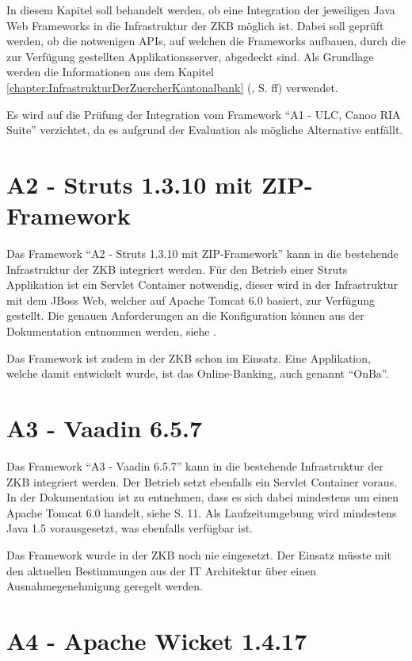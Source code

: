 In diesem Kapitel soll behandelt werden, ob eine Integration der jeweiligen Java
Web Frameworks in die Infrastruktur der \ac{ZKB} möglich ist. Dabei soll geprüft
werden, ob die notwenigen \acp{API}, auf welchen die Frameworks aufbauen, durch
die zur Verfügung gestellten Applikationsserver, abgedeckt sind. Als Grundlage
werden die Informationen aus dem Kapitel
\ref{chapter:InfrastrukturDerZuercherKantonalbank}
(, S.
\pageref{chapter:InfrastrukturDerZuercherKantonalbank}ff) verwendet.

Es wird auf die Prüfung der Integration vom Framework ``A1 - ULC, Canoo RIA
Suite'' verzichtet, da es aufgrund der Evaluation als mögliche Alternative
entfällt.

\section{A2 - Struts 1.3.10 mit ZIP-Framework}

Das Framework ``A2 - Struts 1.3.10 mit ZIP-Framework'' kann in die bestehende
Infrastruktur der \ac{ZKB} integriert werden. Für den Betrieb einer Struts
Applikation ist ein Servlet Container notwendig, dieser wird in der
Infrastruktur mit dem JBoss Web, welcher auf Apache Tomcat 6.0 basiert, zur
Verfügung gestellt. Die genauen Anforderungen an die Konfiguration können aus
der Dokumentation entnommen werden, siehe \cite{StrutsDokumentation}.

Das Framework ist zudem in der \ac{ZKB} schon im Einsatz. Eine Applikation,
welche damit entwickelt wurde, ist das Online-Banking, auch genannt ``OnBa''.

\section{A3 - Vaadin 6.5.7}

Das Framework ``A3 - Vaadin 6.5.7'' kann in die bestehende
Infrastruktur der \ac{ZKB} integriert werden. Der Betrieb setzt ebenfalls ein
Servlet Container voraus. In der Dokumentation ist zu entnehmen, dass es sich
dabei mindestens um einen Apache Tomcat 6.0 handelt, siehe \cite{BookOfVaadin}
S. 11. Als Laufzeitumgebung wird mindestens Java 1.5 vorausgesetzt, was
ebenfalls verfügbar ist.

Das Framework wurde in der \ac{ZKB} noch nie eingesetzt. Der Einsatz müsste mit
den aktuellen Bestimmungen aus der IT Architektur über einen Ausnahmegenehmigung
geregelt werden.

\section{A4 - Apache Wicket 1.4.17}

